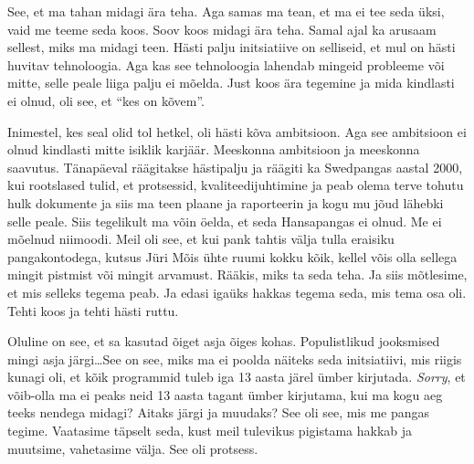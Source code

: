 
See, et ma tahan midagi ära teha. Aga samas ma tean, et ma ei tee seda üksi, vaid me teeme seda koos. Soov koos midagi ära teha. Samal ajal ka arusaam sellest, miks ma midagi teen. Hästi palju initsiatiive on selliseid, et mul on  hästi huvitav tehnoloogia. Aga kas see tehnoloogia lahendab mingeid probleeme või mitte, selle peale liiga palju ei mõelda. Just  koos ära tegemine ja mida kindlasti ei olnud, oli see, et \enquote{kes on kõvem}.

Inimestel, kes seal olid tol hetkel, oli hästi kõva ambitsioon. Aga see ambitsioon ei olnud kindlasti mitte isiklik karjäär.  Meeskonna ambitsioon ja meeskonna saavutus. Tänapäeval räägitakse hästipalju ja räägiti ka Swedpangas aastal 2000, kui rootslased tulid, et protsessid, kvaliteedijuhtimine ja peab olema terve tohutu hulk dokumente ja siis ma teen plaane ja  raporteerin ja kogu mu jõud lähebki  selle peale. Siis tegelikult ma võin öelda, et seda Hansapangas ei olnud. Me ei mõelnud niimoodi. Meil oli see, et kui pank tahtis välja tulla eraisiku pangakontodega, kutsus Jüri Mõis ühte ruumi kokku kõik, kellel võis olla sellega mingit pistmist või mingit arvamust. Rääkis, miks ta seda teha. Ja siis mõtlesime, et mis selleks tegema peab. Ja edasi igaüks hakkas tegema seda, mis tema osa oli. Tehti koos ja tehti hästi ruttu. 


Oluline on see, et sa kasutad õiget asja õiges kohas. Populistlikud jooksmised mingi asja järgi\ldots See on see, miks ma ei poolda näiteks seda initsiatiivi, mis riigis  kunagi oli, et kõik programmid tuleb iga 13 aasta järel ümber kirjutada. \emph{Sorry}, et võib-olla ma ei peaks neid 13 aasta tagant ümber kirjutama, kui ma kogu aeg teeks nendega midagi? Aitaks järgi ja muudaks? See oli see, mis me pangas tegime. Vaatasime täpselt seda,  kust meil tulevikus pigistama hakkab ja muutsime, vahetasime välja. See oli protsess. 


